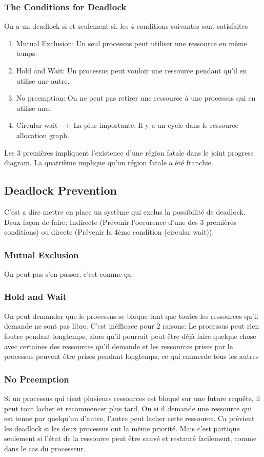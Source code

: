 \subsubsection{The Conditions for Deadlock}
On a un deadlock si et seulement si, les 4 conditions suivantes sont satisfaites
\begin{enumerate}
  \item Mutual Exclusion: Un seul processus peut utiliser une ressource en même temps.
  \item Hold and Wait: Un processus peut vouloir une ressource pendant qu'il en utilise une autre.
  \item No preemption: On ne peut pas retirer une ressource à une processus qui en utilise une.
  \item Circular wait $\to$ La plus importante: Il y a un cycle dans le ressource allocation graph.
\end{enumerate}
Les 3 premières impliquent l'existence d'une région fatale dans le joint progress diagram.
La quatrième implique qu'un région fatale a été franchie.

\subsection{Deadlock Prevention}
C'est a dire mettre en place un système qui exclus la possibilité de deadlock.
Deux façon de faire:
Indirecte (Prévenir l'occurence d'une des 3 premières conditions)
ou directe (Prévenir la 4ème condition (circular wait)).

\subsubsection{Mutual Exclusion}
On peut pas s'en passer, c'est comme ça.

\subsubsection{Hold and Wait}
On peut demander que le processus se bloque tant que toutes les ressources qu'il demande ne sont pas libre.
C'est inéfficace pour 2 raisons:
Le processus peut rien foutre pendant longtemps,
alors qu'il pourrait peut être déjà faire quelque chose avec certaines des ressources qu'il demande et les ressources prises
par le processus peuvent être prises pendant longtemps, ce qui emmerde tous les autres

\subsubsection{No Preemption}
Si un processus qui tient plusieurs ressources est bloqué sur une future requête,
il peut tout lacher et recommencer plus tard.
Ou si il demande une ressource qui est tenue par quelqu'un d'autre,
l'autre peut lacher cette ressource.
Ca prévient les deadlock si les deux processus ont la même priorité.
Mais c'est partique seulement si l'état de la ressource peut être sauvé et restauré facilement,
comme dans le cas du processeur.

